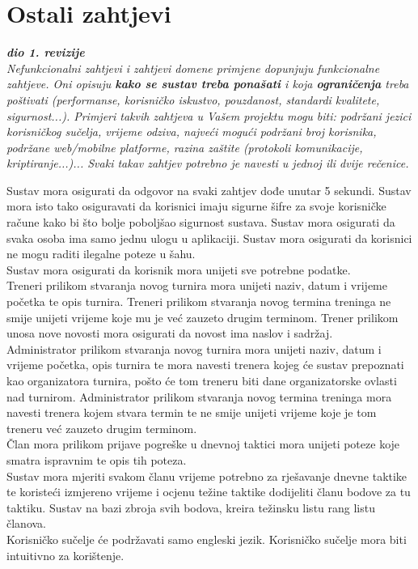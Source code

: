 				\eject
	
		\section{Ostali zahtjevi}
		
			\textbf{\textit{dio 1. revizije}}\\
			
			\textit{Nefunkcionalni zahtjevi i zahtjevi domene primjene dopunjuju funkcionalne zahtjeve. Oni opisuju \textbf{kako se sustav treba ponašati} i koja \textbf{ograničenja} treba poštivati (performanse, korisničko iskustvo, pouzdanost, standardi kvalitete, sigurnost...). Primjeri takvih zahtjeva u Vašem projektu mogu biti: podržani jezici korisničkog sučelja, vrijeme odziva, najveći mogući podržani broj korisnika, podržane web/mobilne platforme, razina zaštite (protokoli komunikacije, kriptiranje...)... Svaki takav zahtjev potrebno je navesti u jednoj ili dvije rečenice.}
			
			Sustav mora osigurati da odgovor na svaki zahtjev dođe unutar 5 sekundi. Sustav mora isto tako osiguravati da korisnici imaju sigurne šifre za svoje korisničke račune kako bi što bolje poboljšao sigurnost sustava. Sustav mora osigurati da svaka osoba ima samo jednu ulogu u aplikaciji. Sustav mora osigurati da korisnici ne mogu raditi ilegalne poteze u šahu.\\
			Sustav mora osigurati da korisnik mora unijeti sve potrebne podatke. \\
			Treneri prilikom stvaranja novog turnira mora unijeti naziv, datum i vrijeme početka te opis turnira. Treneri prilikom stvaranja novog termina treninga ne smije unijeti vrijeme koje mu je već zauzeto drugim terminom. Trener prilikom unosa nove novosti mora osigurati da novost ima naslov i sadržaj. \\
			Administrator prilikom stvaranja novog turnira mora unijeti naziv, datum i vrijeme početka, opis turnira te mora navesti trenera kojeg će sustav prepoznati kao organizatora turnira, pošto će tom treneru biti dane organizatorske ovlasti nad turnirom. Administrator prilikom stvaranja novog termina treninga mora navesti trenera kojem stvara termin te ne smije unijeti vrijeme koje je tom treneru već zauzeto drugim terminom.\\
			Član mora prilikom prijave pogreške u dnevnoj taktici mora unijeti poteze koje smatra ispravnim te opis tih poteza.\\
			Sustav mora mjeriti svakom članu vrijeme potrebno za rješavanje dnevne taktike te koristeći izmjereno vrijeme i ocjenu težine taktike dodijeliti članu bodove za tu taktiku. Sustav na bazi zbroja svih bodova, kreira težinsku listu rang listu članova.\\
			Korisničko sučelje će podržavati samo engleski jezik. Korisničko sučelje mora biti intuitivno za korištenje.\\
			
		 
			 
			 
			 
			 
	